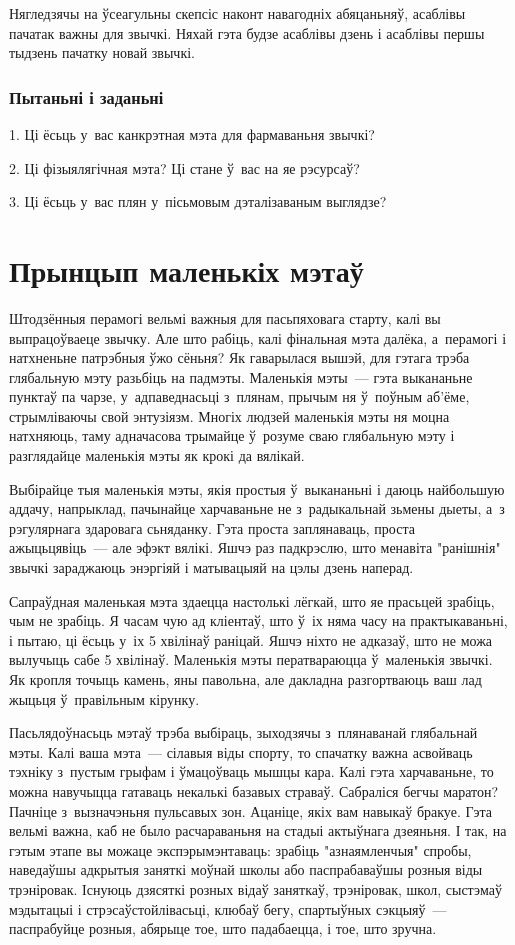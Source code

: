 Нягледзячы на ўсеагульны скепсіс наконт навагодніх абяцаньняў, асаблівы пачатак важны для звычкі. Няхай гэта будзе асаблівы дзень і асаблівы першы тыдзень пачатку новай звычкі.

\subsubsection{Пытаньні і заданьні}

1. Ці ёсьць у~вас канкрэтная мэта для фармаваньня звычкі?

2. Ці фізыялягічная мэта? Ці стане ў~вас на яе рэсурсаў?

3. Ці ёсьць у~вас плян у~пісьмовым дэталізаваным выглядзе?


\section{Прынцып маленькіх мэтаў}

Штодзённыя перамогі вельмі важныя для пасьпяховага старту, калі вы выпрацоўваеце звычку. Але што рабіць, калі фінальная мэта далёка, а~перамогі і натхненьне патрэбныя ўжо сёньня? Як гаварылася вышэй, для гэтага трэба глябальную мэту разьбіць на падмэты. Маленькія мэты~--- гэта выкананьне пунктаў па чарзе, у~адпаведнасьці з~плянам, прычым ня ў~поўным аб'ёме, стрымліваючы свой энтузіязм. Многіх людзей маленькія мэты ня моцна натхняюць, таму адначасова трымайце ў~розуме сваю глябальную мэту і разглядайце маленькія мэты як крокі да вялікай.

Выбірайце тыя маленькія мэты, якія простыя ў~выкананьні і даюць найбольшую аддачу, напрыклад, пачынайце харчаваньне не з~радыкальнай зьмены дыеты, а~з рэгулярнага здаровага сьняданку. Гэта проста заплянаваць, проста ажыцьцявіць~--- але эфэкт вялікі. Яшчэ раз падкрэслю, што менавіта "ранішнія" звычкі зараджаюць энэргіяй і матывацыяй на цэлы дзень наперад.

Сапраўдная маленькая мэта здаецца настолькі лёгкай, што яе прасьцей зрабіць, чым не зрабіць. Я часам чую ад кліентаў, што ў~іх няма часу на практыкаваньні, і пытаю, ці ёсьць у~іх 5 хвілінаў раніцай. Яшчэ ніхто не адказаў, што не можа вылучыць сабе 5 хвілінаў. Маленькія мэты ператвараюцца ў~маленькія звычкі. Як кропля точыць камень, яны павольна, але дакладна разгортваюць ваш лад жыцьця ў~правільным кірунку.

Пасьлядоўнасьць мэтаў трэба выбіраць, зыходзячы з~плянаванай глябальнай мэты. Калі ваша мэта~--- сілавыя віды спорту, то спачатку важна асвойваць тэхніку з~пустым грыфам і ўмацоўваць мышцы кара. Калі гэта харчаваньне, то можна навучыцца гатаваць некалькі базавых страваў. Сабраліся бегчы маратон? Пачніце з~вызначэньня пульсавых зон. Ацаніце, якіх вам навыкаў бракуе. Гэта вельмі важна, каб не было расчараваньня на стадыі актыўнага дзеяньня. І так, на гэтым этапе вы можаце экспэрымэнтаваць: зрабіць "азнаямленчыя" спробы, наведаўшы адкрытыя заняткі моўнай школы або паспрабаваўшы розныя віды трэніровак. Існуюць дзясяткі розных відаў заняткаў, трэніровак, школ, сыстэмаў мэдытацыі і стрэсаўстойлівасьці, клюбаў бегу, спартыўных сэкцыяў~--- паспрабуйце розныя, абярыце тое, што падабаецца, і тое, што зручна.

